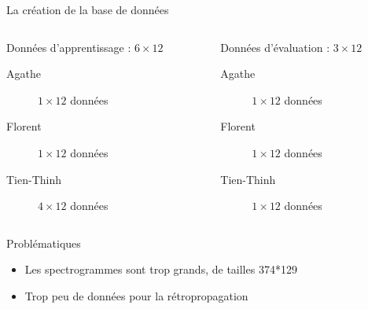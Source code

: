 \begin{frame}{La création de la base de données}
	\begin{columns}[T]
		\begin{column}[]{0.47\textwidth}
			\begin{exampleblock}{Données d'apprentissage : $6\times 12$}
				\begin{description}
					\item[Agathe]  $1\times12$ données
					\item[Florent]  $1\times12$ données
					\item[Tien-Thinh]  $4\times12$ données
				\end{description}
			\end{exampleblock}
		\end{column}
		\begin{column}[]{0.47\textwidth}
			\begin{alertblock}{Données d'évaluation : $3\times 12$}
				\begin{description}
					\item[Agathe]  $1\times12$ données
					\item[Florent]  $1\times12$ données
					\item[Tien-Thinh]  $1\times12$ données
				\end{description}
			\end{alertblock}
		\end{column}
	\end{columns}
	\begin{block}{Problématiques}
		\begin{itemize}
			\item Les spectrogrammes sont trop grands, de tailles 374*129
			\item Trop peu de données pour la rétropropagation
		\end{itemize}
	\end{block}
\end{frame}


